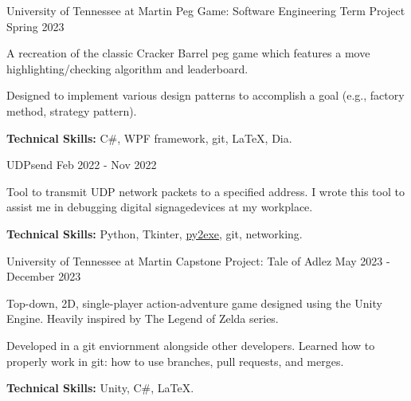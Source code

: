 
\begin{cventries}

	\cventry
		{University of Tennessee at Martin}
		{Peg Game: Software Engineering Term Project}
		{}
		{Spring 2023}
		{
		\begin{cvitems}
			\item A recreation of the classic Cracker Barrel peg game which features a move highlighting/checking algorithm and leaderboard.
			\item Designed to implement various design patterns to accomplish a goal (e.g., factory method, strategy pattern).
			\item \textbf{Technical Skills:} C\#, WPF framework, git, \LaTeX, Dia.
		\end{cvitems}
		}
		
	\cventry
		{}
		{UDPsend}
		{}
		{Feb 2022 - Nov 2022}
		{
		\vspace{-1.5em}
		\begin{cvitems}
			\item Tool to transmit UDP network packets to a specified address. I wrote this tool to assist me in debugging digital signage\newline devices at my workplace.
			\item \textbf{Technical Skills:} Python, Tkinter, \href{https://www.py2exe.org/}{py2exe}, git, networking.
		\end{cvitems}
		}	
		
	\cventry
		{University of Tennessee at Martin}
		{Capstone Project: Tale of Adlez}
		{}
		{May 2023 - December 2023}
		{
		\begin{cvitems}
			\item Top-down, 2D, single-player action-adventure game designed using the Unity Engine. Heavily inspired by The Legend of Zelda series.
			\item Developed in a git enviornment alongside other developers. Learned how to properly work in git: how to use branches, pull requests, and merges.
			\item \textbf{Technical Skills:} Unity, C\#, \LaTeX.
		\end{cvitems}
		}		

		



\end{cventries}
